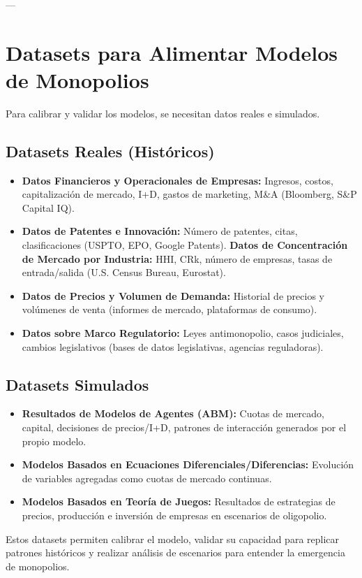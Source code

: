 \documentclass{article}
\begin{document}
---

\section{Datasets para Alimentar Modelos de Monopolios}

Para calibrar y validar los modelos, se necesitan datos reales e simulados.

\subsection{Datasets Reales (Históricos)}
\begin{itemize}
    \item \textbf{Datos Financieros y Operacionales de Empresas:} Ingresos, costos, capitalización de mercado, I+D, gastos de marketing, M\&A (Bloomberg, S\&P Capital IQ).
    \item \textbf{Datos de Patentes e Innovación:} Número de patentes, citas, clasificaciones (USPTO, EPO, Google Patents).
    \textbf{Datos de Concentración de Mercado por Industria:} HHI, CRk, número de empresas, tasas de entrada/salida (U.S. Census Bureau, Eurostat).
    \item \textbf{Datos de Precios y Volumen de Demanda:} Historial de precios y volúmenes de venta (informes de mercado, plataformas de consumo).
    \item \textbf{Datos sobre Marco Regulatorio:} Leyes antimonopolio, casos judiciales, cambios legislativos (bases de datos legislativas, agencias reguladoras).
\end{itemize}

\subsection{Datasets Simulados}
\begin{itemize}
    \item \textbf{Resultados de Modelos de Agentes (ABM):} Cuotas de mercado, capital, decisiones de precios/I+D, patrones de interacción generados por el propio modelo.
    \item \textbf{Modelos Basados en Ecuaciones Diferenciales/Diferencias:} Evolución de variables agregadas como cuotas de mercado continuas.
    \item \textbf{Modelos Basados en Teoría de Juegos:} Resultados de estrategias de precios, producción e inversión de empresas en escenarios de oligopolio.
\end{itemize}
Estos datasets permiten calibrar el modelo, validar su capacidad para replicar patrones históricos y realizar análisis de escenarios para entender la emergencia de monopolios.
\end{document}
